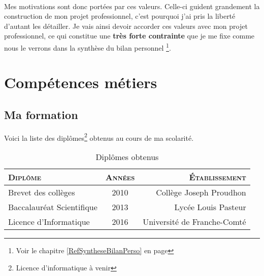 \documentclass[a4paper,12pt, draft]{report}
\newcommand{\tabTitle}[1]{\hfill{} \textsc{#1} \hfill{} }
\begin{document}

\paragraph{}
Mes motivations sont donc portées par ces valeurs. Celle-ci guident grandement la construction de mon projet professionnel, c'est pourquoi j'ai pris la liberté d'autant les détailler.
Je vais ainsi devoir accorder ces valeurs avec mon projet professionnel, ce qui constitue une \textbf{très forte contrainte} que je me fixe comme nous le verrons dans la synthèse du bilan personnel \footnote{Voir le chapitre \ref{RefSyntheseBilanPerso} en page \pageref{RefSyntheseBilanPerso}}.

\newpage

\section{Compétences métiers}
\subsection{Ma formation}
Voici la liste des diplômes\footnote{Licence d'informatique à venir} obtenus au cours de ma scolarité.
\begin{table}[h]
\begin{center}
\begin{tabular}{|l|c|r|}
\hline
\tabTitle{Diplôme} & \tabTitle{Années} & \tabTitle{Établissement}\\
\hline
Brevet des collèges & 2010 & Collège Joseph Proudhon \\
\hline
Baccalauréat Scientifique & 2013 & Lycée Louis Pasteur \\
\hline
Licence d'Informatique & 2016 & Université de Franche-Comté\\
\hline
\end{tabular}
\end{center}
\caption{Diplômes obtenus} 
\end{table}
\end{document}
